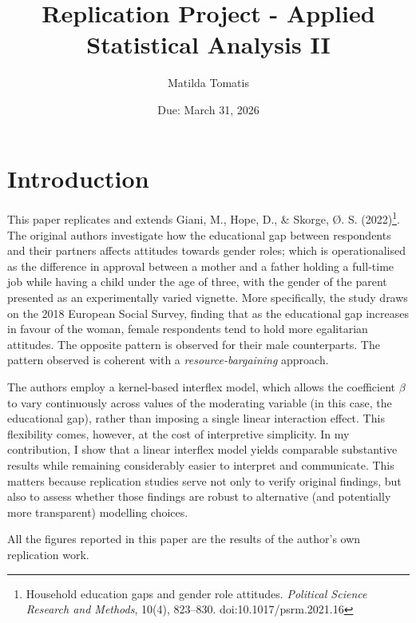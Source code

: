 \documentclass[12pt,letterpaper]{article}
\title{Replication Project - Applied Statistical Analysis II}
\date{Due: March 31, 2026}
\author{Matilda Tomatis}
\begin{document}
	
	\maketitle
	\tableofcontents
	\newpage
	
	\section{Introduction}
	
\vspace{0.5cm}
	
\noindent This paper replicates and extends Giani, M., Hope, D., \& Skorge, \O. S. (2022)\footnote{Household education gaps and gender role attitudes. \textit{Political Science Research and Methods}, 10(4), 823--830. doi:10.1017/psrm.2021.16}. The original authors investigate how the educational gap between respondents and their partners affects attitudes towards gender roles; which is operationalised as the difference in approval between a mother and a father holding a full-time job while having a child under the age of three, with the gender of the parent presented as an experimentally varied vignette. More specifically, the study draws on the 2018 European Social Survey, finding that as the educational gap increases in favour of the woman, female respondents tend to hold more egalitarian attitudes. The opposite pattern is observed for their male counterparts. The pattern observed is coherent with a \emph{resource-bargaining} approach. 

\vspace{0.5cm}
\noindent The authors employ a kernel-based interflex model, which allows the coefficient $\beta$ to vary continuously across values of the moderating variable (in this case, the educational gap), rather than imposing a single linear interaction effect. This flexibility comes, however, at the cost of interpretive simplicity. In my contribution, I show that a linear interflex model yields comparable substantive results while remaining considerably easier to interpret and communicate. This matters because replication studies serve not only to verify original findings, but also to assess whether those findings are robust to alternative (and potentially more transparent) modelling choices.

\vspace{0.5cm}
\noindent All the figures reported in this paper are the results of the author's own replication work. 


\vspace{1.5cm}
	
\end{document}
